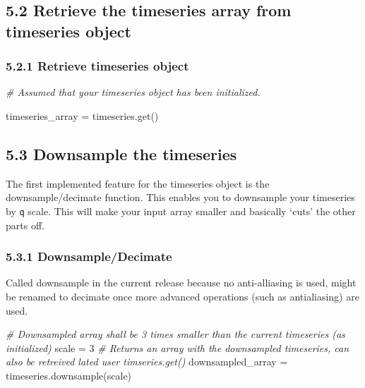 \documentclass[]{article}
\newenvironment{Shaded}{}{}
\newcommand{\DecValTok}[1]{\textcolor[rgb]{0.25,0.63,0.44}{#1}}
\newcommand{\CommentTok}[1]{\textcolor[rgb]{0.38,0.63,0.69}{\textit{#1}}}
\newcommand{\OperatorTok}[1]{\textcolor[rgb]{0.40,0.40,0.40}{#1}}
\newcommand{\NormalTok}[1]{#1}
\begin{document}
\subsection{5.2 Retrieve the timeseries array from timeseries
object}\label{retrieve-the-timeseries-array-from-timeseries-object}

\subsubsection{5.2.1 Retrieve timeseries
object}\label{retrieve-timeseries-object}

\begin{Shaded}
\begin{Highlighting}[]
\CommentTok{# Assumed that your timeseries object has been initialized. }

\NormalTok{timeseries_array }\OperatorTok{=}\NormalTok{ timeseries.get()}
\end{Highlighting}
\end{Shaded}

\subsection{5.3 Downsample the
timeseries}\label{downsample-the-timeseries}

The first implemented feature for the timeseries object is the
downsample/decimate function. This enables you to downsample your
timeseries by \texttt{q} scale. This will make your input array smaller
and basically `cuts' the other parts off.

\subsubsection{5.3.1 Downsample/Decimate}\label{downsampledecimate}

Called downsample in the current release because no anti-alliasing is
used, might be renamed to decimate once more advanced operations (such
as antialiasing) are used.

\begin{Shaded}
\begin{Highlighting}[]
\CommentTok{# Downsampled array shall be 3 times smaller than the current timeseries (as initialized) }
\NormalTok{scale }\OperatorTok{=} \DecValTok{3}
\CommentTok{# Returns an array with the downsampled timeseries, can also be retreived lated user timseries.get()}
\NormalTok{downsampled_array }\OperatorTok{=}\NormalTok{ timeseries.downsample(scale)}
\end{Highlighting}
\end{Shaded}
\end{document}
